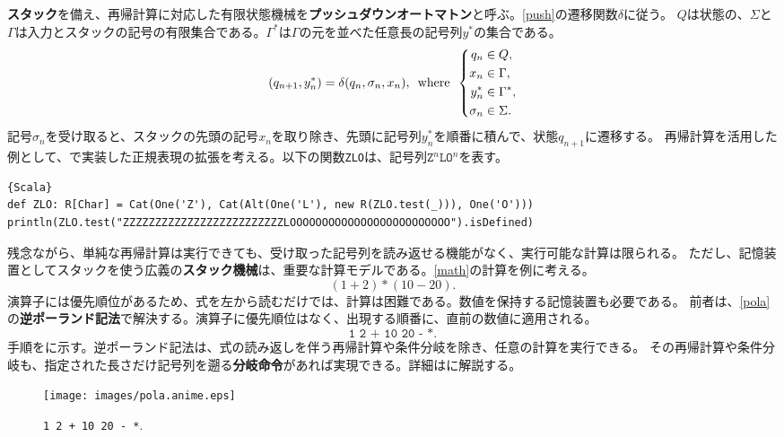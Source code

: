 \documentclass[10pt,a4paper]{book}
\begin{document}
\textbf{スタック}を備え、再帰計算に対応した有限状態機械を\textbf{プッシュダウンオートマトン}と呼ぶ。\eqref{push}の遷移関数$\delta$に従う。
$Q$は状態の、$\Sigma$と$\Gamma$は入力とスタックの記号の有限集合である。$\Gamma^*$は$\Gamma$の元を並べた任意長の記号列$y^*$の集合である。
%
\begin{equation}
\label{eq:push}
(q_{n+1},y^*_n) = \delta(q_n,\sigma_n,x_n),
\enspace\mathrm{where}\enspace
\left\{
\begin{aligned}
q_n &\in Q,\\
x_n &\in \Gamma,\\
y^*_n &\in \Gamma^*,\\
\sigma_n &\in \Sigma.
\end{aligned}
\right.
\end{equation}
%
記号$\sigma_n$を受け取ると、スタックの先頭の記号$x_n$を取り除き、先頭に記号列$y^*_n$を順番に積んで、状態$q_{n+1}$に遷移する。
再帰計算を活用した例として、で実装した正規表現の拡張を考える。以下の関数\texttt{ZLO}は、記号列$\texttt{Z}^n\texttt{L}\texttt{O}^n$を表す。

\begin{Verbatim}{Scala}
def ZLO: R[Char] = Cat(One('Z'), Cat(Alt(One('L'), new R(ZLO.test(_))), One('O')))
println(ZLO.test("ZZZZZZZZZZZZZZZZZZZZZZZZZLOOOOOOOOOOOOOOOOOOOOOOOOO").isDefined)
\end{Verbatim}

残念ながら、単純な再帰計算は実行できても、受け取った記号列を読み返せる機能がなく、実行可能な計算は限られる。
ただし、記憶装置としてスタックを使う広義の\textbf{スタック機械}は、重要な計算モデルである。\eqref{math}の計算を例に考える。
%
\begin{equation}
\label{eq:math}
(1 + 2) * (10 - 20).
\end{equation}
%
演算子には優先順位があるため、式を左から読むだけでは、計算は困難である。数値を保持する記憶装置も必要である。
前者は、\eqref{pola}の\textbf{逆ポーランド記法}で解決する。演算子に優先順位はなく、出現する順番に、直前の数値に適用される。
%
\begin{equation}
\label{eq:pola}
\texttt{1 2 + 10 20 - *}.
\end{equation}
%
手順をに示す。逆ポーランド記法は、式の読み返しを伴う再帰計算や条件分岐を除き、任意の計算を実行できる。
その再帰計算や条件分岐も、指定された長さだけ記号列を遡る\textbf{分岐命令}があれば実現できる。詳細はに解説する。

\begin{figure}[h]
\centering
\texttt{[image: images/pola.anime.eps]}
\caption{\texttt{1 2 + 10 20 - *}.\label{fig:math}}
\end{figure}
\end{document}
